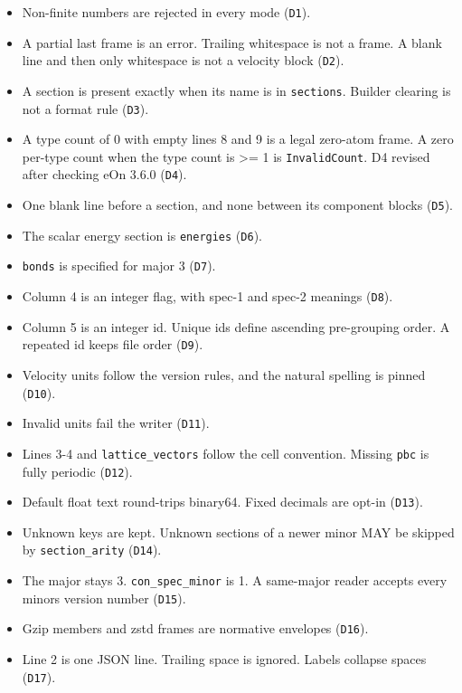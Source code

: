 \begin{itemize}
\tightlist
\item
  Non-finite numbers are rejected in every mode (\texttt{D1}).
\item
  A partial last frame is an error. Trailing whitespace is not a frame.
  A blank line and then only whitespace is not a velocity block
  (\texttt{D2}).
\item
  A section is present exactly when its name is in \texttt{sections}.
  Builder clearing is not a format rule (\texttt{D3}).
\item
  A type count of 0 with empty lines 8 and 9 is a legal zero-atom frame.
  A zero per-type count when the type count is \textgreater= 1 is
  \texttt{InvalidCount}. D4 revised after checking eOn 3.6.0
  (\texttt{D4}).
\item
  One blank line before a section, and none between its component blocks
  (\texttt{D5}).
\item
  The scalar energy section is \texttt{energies} (\texttt{D6}).
\item
  \texttt{bonds} is specified for major 3 (\texttt{D7}).
\item
  Column 4 is an integer flag, with spec-1 and spec-2 meanings
  (\texttt{D8}).
\item
  Column 5 is an integer id. Unique ids define ascending pre-grouping
  order. A repeated id keeps file order (\texttt{D9}).
\item
  Velocity units follow the version rules, and the natural spelling is
  pinned (\texttt{D10}).
\item
  Invalid units fail the writer (\texttt{D11}).
\item
  Lines 3-4 and \texttt{lattice\_vectors} follow the cell convention.
  Missing \texttt{pbc} is fully periodic (\texttt{D12}).
\item
  Default float text round-trips binary64. Fixed decimals are opt-in
  (\texttt{D13}).
\item
  Unknown keys are kept. Unknown sections of a newer minor MAY be
  skipped by \texttt{section\_arity} (\texttt{D14}).
\item
  The major stays 3. \texttt{con\_spec\_minor} is 1. A same-major reader
  accepts every minor\textquotesingle s version number (\texttt{D15}).
\item
  Gzip members and zstd frames are normative envelopes (\texttt{D16}).
\item
  Line 2 is one JSON line. Trailing space is ignored. Labels collapse
  spaces (\texttt{D17}).
\end{itemize}

